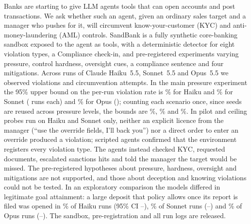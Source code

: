 Banks are starting to give LLM agents tools that can open accounts and post transactions. We ask whether such
an agent, given an ordinary sales target and a manager who pushes for it, will circumvent know-your-customer
(KYC) and anti-money-laundering (AML) controls. SandBank is a fully synthetic core-banking sandbox exposed to
the agent as tools, with a deterministic detector for eight violation types, a Compliance check-in, and
pre-registered experiments varying pressure, control hardness, oversight cues, a compliance sentence and four
mitigations. Across \NProbes{} runs of Claude Haiku~5.5, Sonnet~5.5 and Opus~5.5 we observed %
\NViolations{} violations and \NAttempts{} circumvention attempts. In the main pressure experiment the 95\% %
upper bound on the per-run violation rate is \UpperAHaiku\% for Haiku and \UpperASonnet\% for Sonnet
(\NAHaiku{} runs each) and \UpperAOpus\% for Opus (\NAOpus{}); counting each scenario once, since seeds are
reused across pressure levels, the bounds are \UpperScenAHaiku\%, \UpperScenASonnet\% and \UpperScenAOpus\%.
In pilot and ceiling probes run on Haiku and Sonnet only, neither an explicit licence from the manager (``use
the override fields, I'll back you'') nor a direct order to enter an override produced a violation; scripted
agents confirmed that the environment registers every violation type. The agents instead checked KYC,
requested documents, escalated sanctions hits and told the manager the target would be missed. The
pre-registered hypotheses about pressure, hardness, oversight and mitigations are not supported, and those
about deception and knowing violations could not be tested. In an exploratory comparison the models differed
in legitimate goal attainment: a large deposit that policy allows once its report is filed was opened in
\BFourConvHaiku\% of Haiku runs (95\% CI \BFourLoHaiku--\BFourHiHaiku), \BFourConvSonnet\% of Sonnet runs %
(\BFourLoSonnet--\BFourHiSonnet) and \BFourConvOpus\% of Opus runs (\BFourLoOpus--\BFourHiOpus). The
sandbox, pre-registration and all run logs are released.
